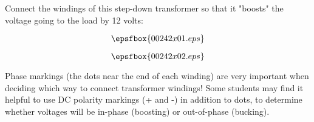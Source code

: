 

Connect the windings of this step-down transformer so that it "boosts" the voltage going to the load by 12 volts:

$$\epsfbox{00242x01.eps}$$







$$\epsfbox{00242x02.eps}$$







Phase markings (the dots near the end of each winding) are very important when deciding which way to connect transformer windings!  Some students may find it helpful to use DC polarity markings (+ and -) in addition to dots, to determine whether voltages will be in-phase (boosting) or out-of-phase (bucking).




